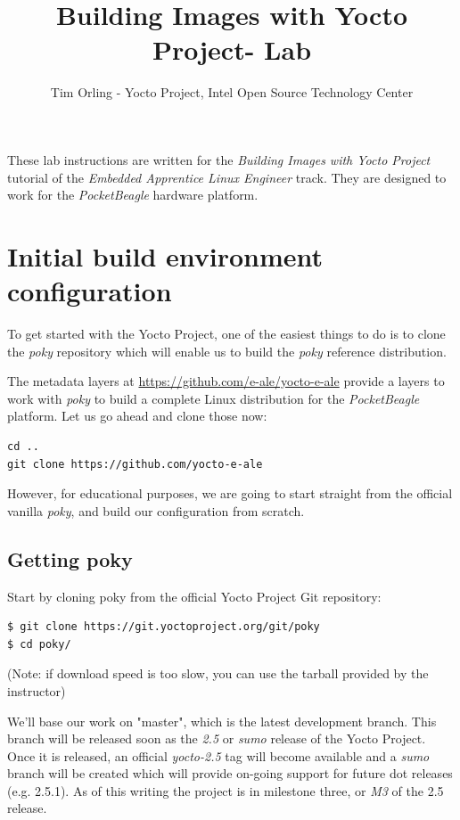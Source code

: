 \documentclass[a4paper,12pt,obeyspaces,spaces,hyphens]{article}
\title{Building Images with Yocto Project- Lab}
\author{Tim Orling - Yocto Project, Intel Open Source Technology Center}
\newcommand{\code}[1]
{\path{#1}}
\begin{document}
\maketitle
\thispagestyle{fancy}

These lab instructions are written for the {\em Building Images with Yocto Project} tutorial of the {\em Embedded Apprentice Linux Engineer}
track. They are designed to work for the {\em PocketBeagle} hardware
platform.

\section{Initial build environment configuration}

To get started with the Yocto Project, one of the easiest things to do is to clone the {\em poky} repository which will enable us to build the {\em poky} reference distribution.

The metadata layers at \url{https://github.com/e-ale/yocto-e-ale}
provide a layers to work with {\em poky} to build a complete Linux distribution for the {\em PocketBeagle}
platform. Let us go ahead and clone those now:

\begin{verbatim}
cd ..
git clone https://github.com/yocto-e-ale
\end{verbatim}

However, for educational purposes, we are going to start
straight from the official vanilla {\em poky}, and build our
configuration from scratch.

\subsection{Getting poky}

Start by cloning poky from the official Yocto Project Git repository:

\begin{verbatim}
$ git clone https://git.yoctoproject.org/git/poky
$ cd poky/
\end{verbatim}

(Note: if download speed is too slow, you can use the
\code{poky.tar.xz} tarball provided by the instructor)

We'll base our work on "master", which is the latest development branch. This branch will be released soon as the {\em 2.5} or {\em sumo} release of the Yocto Project. Once it is released, an official {\em yocto-2.5} tag will become available and a {\em sumo} branch will be created which will provide on-going support for future dot releases (e.g. 2.5.1). As of this writing the project is in milestone three, or {\em M3} of the 2.5 release. 
\end{document}
